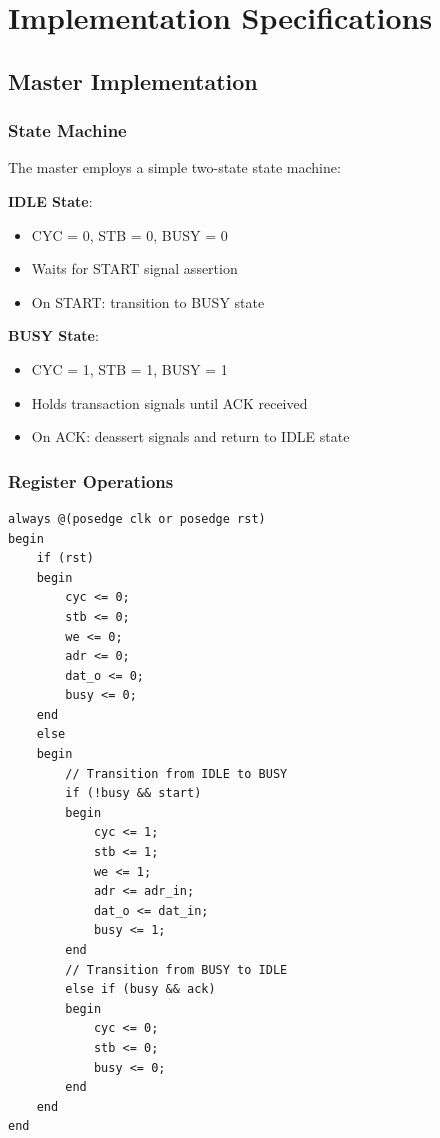 \documentclass[12pt,a4paper]{article}
\begin{document}
\section{Implementation Specifications}

\subsection{Master Implementation}

\subsubsection{State Machine}
The master employs a simple two-state state machine:

\textbf{IDLE State}:
\begin{itemize}
    \item CYC = 0, STB = 0, BUSY = 0
    \item Waits for START signal assertion
    \item On START: transition to BUSY state
\end{itemize}

\textbf{BUSY State}:
\begin{itemize}
    \item CYC = 1, STB = 1, BUSY = 1
    \item Holds transaction signals until ACK received
    \item On ACK: deassert signals and return to IDLE state
\end{itemize}

\subsubsection{Register Operations}
\begin{lstlisting}[caption=Master State Machine Logic]
always @(posedge clk or posedge rst)
begin
    if (rst)
    begin
        cyc <= 0;
        stb <= 0;
        we <= 0;
        adr <= 0;
        dat_o <= 0;
        busy <= 0;
    end
    else
    begin
        // Transition from IDLE to BUSY
        if (!busy && start)
        begin
            cyc <= 1;
            stb <= 1;
            we <= 1;
            adr <= adr_in;
            dat_o <= dat_in;
            busy <= 1;
        end
        // Transition from BUSY to IDLE
        else if (busy && ack)
        begin
            cyc <= 0;
            stb <= 0;
            busy <= 0;
        end
    end
end
\end{lstlisting}
\end{document}

